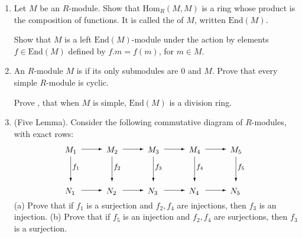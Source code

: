 \documentclass[12pt]{article}
\newcommand{\Hom}{\mbox{Hom}}
\def\demph#1{{\color{blue}{\sl #1}}}
\begin{document}
\begin{enumerate}
 \item Let $M$ be an $R$-module.
   Show that $\Hom_R(M,M)$ is a ring whose product is the composition of functions.
   It is called the \demph{endomorphism ring} of $M$, written $\mbox{End}(M)$.

   Show that $M$ is a left $\mbox{End}(M)$-module under the action by elements $f\in\mbox{End}(M)$ defined by
   $f.m=f(m)$, for $m\in M$.
   \vspace{-2pt}

 \item  An $R$-module $M$ is \demph{simple} if its only submodules are $0$ and $M$.
   Prove that every simple $R$-module is cyclic.

   Prove \demph{Schur's Lemma}, that when $M$ is simple, $\mbox{End}(M)$ is a division ring.
   \vspace{-2pt}


 \item {\color{blue}(Five Lemma).}
   Consider the following commutative diagram of $R$-modules, with exact rows:\vspace{-2pt}
   \[
    \begin{picture}(220,60)
        \put(  0,50){$M_1$} \put( 20,54){\vector(1,0){25}}  
        \put( 50,50){$M_2$} \put( 70,54){\vector(1,0){25}}  
        \put(100,50){$M_3$} \put(120,54){\vector(1,0){25}}  
        \put(150,50){$M_4$} \put(170,54){\vector(1,0){25}}  
        \put(200,50){$M_5$}

        \put(  7,45){\vector(0,-1){30}}  \put(  9,30){\small$f_1$}
        \put( 57,45){\vector(0,-1){30}}  \put( 59,30){\small$f_2$}
        \put(107,45){\vector(0,-1){30}}  \put(109,30){\small$f_3$}
        \put(157,45){\vector(0,-1){30}}  \put(159,30){\small$f_4$}
        \put(207,45){\vector(0,-1){30}}  \put(209,30){\small$f_5$}
        
        \put(  0,0){$N_1$} \put( 20,4){\vector(1,0){25}}  
        \put( 50,0){$N_2$} \put( 70,4){\vector(1,0){25}}  
        \put(100,0){$N_3$} \put(120,4){\vector(1,0){25}}  
        \put(150,0){$N_4$} \put(170,4){\vector(1,0){25}}  
        \put(200,0){$N_5$} 
        \end{picture} 
 \]
 (a) Prove that if $f_1$ is a surjection and $f_2,f_4$ are injections, then $f_3$ is an injection.\newline
 (b) Prove that if $f_5$ is an injection and $f_2,f_4$ are surjections, then $f_3$ is a surjection.\vspace{-2pt}


\end{enumerate}
\end{document}
